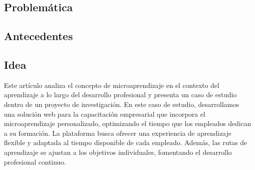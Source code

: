 






\subsection{Problemática}


\subsection{Antecedentes}


\subsection{Idea}
Este artículo analiza el concepto de microaprendizaje en el contexto del
aprendizaje a lo largo del desarrollo profesional y presenta un caso de estudio dentro de un
proyecto de investigación. En este caso de estudio, desarrollamos una solución web para
la capacitación empresarial que incorpora el microaprendizaje personalizado,
optimizando el tiempo que los empleados dedican a su formación. La plataforma
busca ofrecer una experiencia de aprendizaje flexible y adaptada al tiempo
disponible de cada empleado. Además, las rutas de aprendizaje se ajustan a los
objetivos individuales, fomentando el desarrollo profesional continuo.

